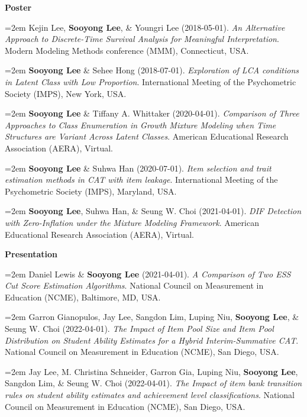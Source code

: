 \documentclass[11pt,a4paper,]{awesome-me}
\begin{document}
\setlength{\leftskip}{0cm}

\textbf{Poster}

\setlength{\leftskip}{0.5cm}

\hangindent=2em  Kejin Lee, \textbf{Sooyong Lee}, \& Youngri
Lee (2018-05-01). \emph{An Alternative Approach to Discrete-Time
Survival Analysis for Meaningful Interpretation}. Modern Modeling
Methods conference (MMM), Connecticut, USA.

\hangindent=2em  \textbf{Sooyong Lee} \& Sehee Hong
(2018-07-01). \emph{Exploration of LCA conditions in Latent Class with
Low Proportion}. International Meeting of the Psychometric Society
(IMPS), New York, USA.

\hangindent=2em  \textbf{Sooyong Lee} \& Tiffany A.
Whittaker (2020-04-01). \emph{Comparison of Three Approaches to Class
Enumeration in Growth Mixture Modeling when Time Structures are Variant
Across Latent Classes}. American Educational Research Association
(AERA), Virtual.

\hangindent=2em  \textbf{Sooyong Lee} \& Suhwa Han
(2020-07-01). \emph{Item selection and trait estimation methods in CAT
with item leakage}. International Meeting of the Psychometric Society
(IMPS), Maryland, USA.

\hangindent=2em  \textbf{Sooyong Lee}, Suhwa Han, \& Seung
W. Choi (2021-04-01). \emph{DIF Detection with Zero-Inflation under the
Mixture Modeling Framework}. American Educational Research Association
(AERA), Virtual.

\setlength{\leftskip}{0cm}

\textbf{Presentation}

\setlength{\leftskip}{0.5cm}

\hangindent=2em  Daniel Lewis \& \textbf{Sooyong Lee}
(2021-04-01). \emph{A Comparison of Two ESS Cut Score Estimation
Algorithms}. National Council on Measurement in Education (NCME),
Baltimore, MD, USA.

\hangindent=2em  Garron Gianopulos, Jay Lee, Sangdon Lim,
Luping Niu, \textbf{Sooyong Lee}, \& Seung W. Choi (2022-04-01).
\emph{The Impact of Item Pool Size and Item Pool Distribution on Student
Ability Estimates for a Hybrid Interim-Summative CAT}. National Council
on Measurement in Education (NCME), San Diego, USA.

\hangindent=2em  Jay Lee, M. Christina Schneider, Garron
Gia, Luping Niu, \textbf{Sooyong Lee}, Sangdon Lim, \& Seung W. Choi
(2022-04-01). \emph{The Impact of item bank transition rules on student
ability estimates and achievement level classifications}. National
Council on Measurement in Education (NCME), San Diego, USA.
\end{document}
